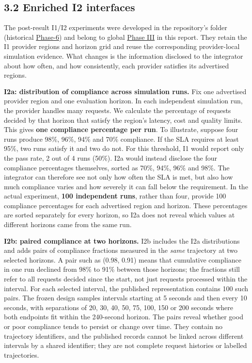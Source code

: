 \documentclass[10pt,a4paper]{article}
\begin{document}
\subsection*{3.2 Enriched I2 interfaces}

The post-result I1/I2 experiments were developed in the repository's  folder (historical \hyperref[app:experiment-stages]{Phase-6}) and belong to global \hyperref[app:experiment-stages]{Phase III} in this report. They retain the I1 provider regions and horizon grid and reuse the corresponding provider-local simulation evidence. What changes is the information disclosed to the integrator about how often, and how consistently, each provider satisfies its advertised regions.

\textbf{I2a: distribution of compliance across simulation runs.} Fix one advertised provider region and one evaluation horizon. In each independent simulation run, the provider handles many requests. We calculate the percentage of requests decided by that horizon that satisfy the region's latency, cost and quality limits. This gives \textbf{one compliance percentage per run}. To illustrate, suppose four runs produce 98\%, 96\%, 94\% and 70\% compliance. If the SLA requires at least 95\%, two runs satisfy it and two do not. For this threshold, I1 would report only the pass rate, 2 out of 4 runs (50\%). I2a would instead disclose the four compliance percentages themselves, sorted as 70\%, 94\%, 96\% and 98\%. The integrator can therefore see not only how often the SLA is met, but also how much compliance varies and how severely it can fall below the requirement. In the actual experiment, \textbf{100 independent runs}, rather than four, provide 100 compliance percentages for each advertised region and horizon. These percentages are sorted separately for every horizon, so I2a does not reveal which values at different horizons came from the same run.

\textbf{I2b: paired compliance at two horizons.} I2b includes the I2a distributions and adds pairs of compliance fractions measured in the \emph{same} trajectory at two selected horizons. A pair such as (0.98, 0.91) means that cumulative compliance in one run declined from 98\% to 91\% between those horizons; the fractions still refer to all requests decided since the start, not just requests processed within the interval. For each selected interval, the published representation contains 100 such pairs. The frozen design samples intervals starting at 5 seconds and then every 10 seconds, with separations of 20, 30, 40, 50, 75, 100, 150 or 200 seconds where both endpoints fit within the 240-second horizon. The pairs reveal whether good or poor compliance tends to persist or change over time. They contain no trajectory identifiers, and the published records cannot be linked across different intervals by a shared identifier; they are not complete request histories or labelled trajectories.
\end{document}
